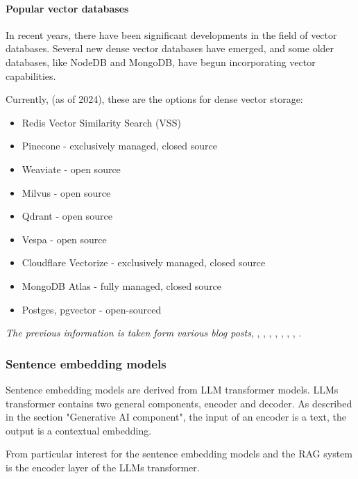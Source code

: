 \documentclass{wseas}
\begin{document}
\paragraph{Popular vector databases}

In recent years, there have been significant developments in the field
of vector databases. Several new dense vector databases have emerged,
and some older databases, like NodeDB and MongoDB, have begun
incorporating vector capabilities.

Currently, (as of 2024), these are the options for dense vector storage:

\begin{itemize}
\item
  Redis Vector Similarity Search (VSS)
\item
  Pinecone - exclusively managed, closed source
\item
  Weaviate - open source
\item
  Milvus - open source
\item
  Qdrant - open source
\item
  Vespa - open source
\item
  Cloudflare Vectorize - exclusively managed, closed source
\item
  MongoDB Atlas - fully managed, closed source
\item
  Postges, pgvector - open-sourced
\end{itemize}

\emph{The previous information is taken form various blog posts}, \cite{website_MediumGuideonRAGDatabases}, \cite{Website_CloudflareGuideonVectorInsertion}, \cite{website_AporiaGuideonVectorDatabasesforRAG}, 
\cite{website_DatabricksGlossaryonRAG}, \cite{website_MongoDBAtlasCLIDocumentation}, \cite{website_MediumGuideonRAGwithAtlas}, \cite{website_Neo4jBlogOnLangchainVectorIndex}, \cite{website_PondhouseGuideOnAdvancedRAG}.

\subsubsection{Sentence embedding models}

Sentence embedding models are derived from LLM transformer models. LLMs
transformer contains two general components, encoder and decoder. As
described in the section "Generative AI component", the input of an encoder is a text, the output is a
contextual embedding.

From particular interest for the sentence embedding models and the RAG
system is the encoder layer of the LLMs transformer.
\end{document}
